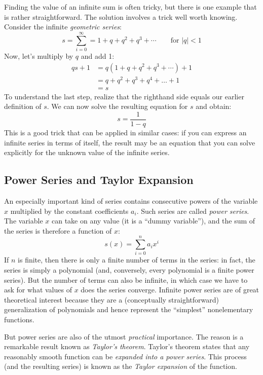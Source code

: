 Finding the value of an infinite sum is often tricky, but there is one
example that is rather straightforward. The solution involves a trick
well worth knowing. Consider the infinite \emph{geometric series}:
%
\[
s = \sum_{i=0}^{\infty} = 1 + q + q^2 + q^3 + \dotsb \qquad \text{for $|q| < 1$}
\]
%
Now, let's multiply by $q$ and add 1:
\begin{align*}
q s + 1 & = q ( 1 + q + q^2 + q^3 + \dotsb ) + 1 \\
        & = q + q^2 + q^3 + q^4 + \dots + 1 \\
        & = s
\end{align*}
%
To understand the last step, realize that the righthand side equals
our earlier definition of $s$. We can now solve the resulting equation
for $s$ and obtain:
%
\[
s = \frac{1}{1-q}
\]
%
This is a good trick that can be applied in similar cases: if you can
express an infinite series in terms of itself, the result may be an
equation that you can solve explicitly for the unknown value of the
infinite series.


\subsection{Power Series and Taylor Expansion}


An especially important kind of series contains consecutive powers of
the variable $x$ multiplied by the constant coefficients $a_i$.  Such
series are called \emph{power series}. The variable $x$ can take on
any value (it is a ``dummy variable''), and the sum of the series is
therefore a function of $x$:
%
\[
s(x) = \sum_{i=0}^n a_i x^i
\]
%
If $n$ is finite, then there is only a finite number of terms in the
series: in fact, the series is simply a polynomial (and, conversely,
every polynomial is a finite power series). But the number of terms
can also be infinite, in which case we have to ask for what values of
$x$ does the series converge. Infinite power series are of great
theoretical interest because they are a (conceptually straightforward)
generalization of polynomials and hence represent the ``simplest''
nonelementary functions.

But power series are also of the utmost \emph{practical} importance.
The reason is a remarkable result known as \emph{Taylor's theorem}.
Taylor's theorem states that any reasonably smooth function can be
\emph{expanded into a power series}. This process (and the resulting
series) is known as the \emph{Taylor expansion} of the function.

